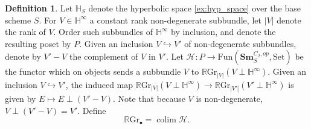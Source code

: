 \documentclass[edeposit,fullpage]{uiucthesis2009}
\newcommand{\mbb}{\mathbb}
\newcommand{\mc}{\mathcal}
\newcommand{\RGr}{\mathbb R\mathrm{Gr}}
\newcommand{\Sm}[1]{\mathbf{Sm}_{#1}}
\DeclareMathOperator*{\colim}{colim}
\theoremstyle{plain}
\numberwithin{lemma}{section}
\theoremstyle{definition}
\newtheorem{definition}[lemma]{Definition}
\begin{document}
\begin{definition}
Let $\mbb H_S$ denote the hyperbolic space \ref{ex:hyp_space} over the base scheme $S$. For $V \in \mbb H^\infty$
a constant rank non-degenerate subbundle,
let $|V|$ denote the rank of $V$. Order such subbundles of $\mbb
H^\infty$ by inclusion, and denote the resulting poset by $P$. Given an inclusion $V \hookrightarrow V'$
of non-degenerate subbundles, denote by $V'-V$ the complement of $V$
in $V'$. Let $\mc H : P \rightarrow \mathrm{Fun}(\Sm{S}^{C_2,
  op},\mathrm{Set})$ be the functor which on objects sends a subbundle $V$ to $
\RGr_{|V|} (V \perp \mbb H^\infty)$. Given an inclusion $V \hookrightarrow V'$, the induced map
$\RGr_{|V|}(V \perp \mbb H^\infty) \rightarrow \RGr_{|V'|}(V' \perp
\mbb H^\infty)$ is given by $E \mapsto E \perp (V'-V)$. Note that
because $V$ is non-degenerate, $V \perp (V'-V) = V'$. Define
\begin{equation}\label{def:RGr_inf}
\RGr_\bullet = \colim \mc H.
\end{equation}

\end{definition}





\end{document}
